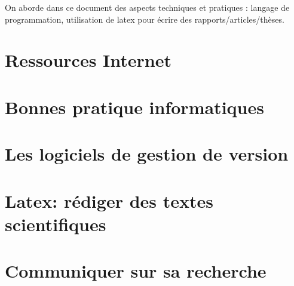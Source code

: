 \documentclass[a4paper,10pt]{book_ad}
\begin{document}
On aborde dans ce document des aspects techniques et pratiques :
langage de programmation, utilisation de latex pour écrire des rapports/articles/thèses.



\tableofcontents 
\newpage

\dominitoc


\chapter{Ressources Internet}
\minitoc



\chapter{Bonnes pratique informatiques}
\minitoc


\chapter{Les logiciels de gestion de version}
\minitoc



\chapter{Latex: rédiger des textes scientifiques}
\minitoc



\chapter{Communiquer sur sa recherche}
\minitoc

\end{document}
